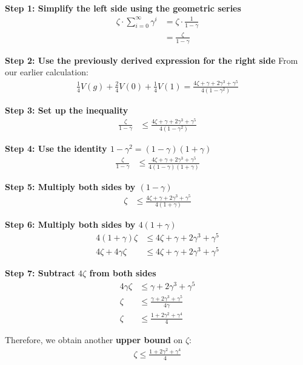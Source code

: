 \textbf{Step 1: Simplify the left side using the geometric series}
\begin{align}
\zeta\cdot\sum_{i=0}^\infty \gamma^i &= \zeta \cdot \frac{1}{1-\gamma}\\
&= \frac{\zeta}{1-\gamma}
\end{align}

\textbf{Step 2: Use the previously derived expression for the right side}
From our earlier calculation:
\begin{align}
\frac{1}{4}V(g) + \frac{2}{4}V(0) + \frac{1}{4}V(1) = \frac{4\zeta + \gamma + 2\gamma^3 + \gamma^5}{4(1-\gamma^2)}
\end{align}

\textbf{Step 3: Set up the inequality}
\begin{align}
\frac{\zeta}{1-\gamma} &\leq \frac{4\zeta + \gamma + 2\gamma^3 + \gamma^5}{4(1-\gamma^2)}
\end{align}

\textbf{Step 4: Use the identity $1-\gamma^2 = (1-\gamma)(1+\gamma)$}
\begin{align}
\frac{\zeta}{1-\gamma} &\leq \frac{4\zeta + \gamma + 2\gamma^3 + \gamma^5}{4(1-\gamma)(1+\gamma)}
\end{align}

\textbf{Step 5: Multiply both sides by $(1-\gamma)$}
\begin{align}
\zeta &\leq \frac{4\zeta + \gamma + 2\gamma^3 + \gamma^5}{4(1+\gamma)}
\end{align}

\textbf{Step 6: Multiply both sides by $4(1+\gamma)$}
\begin{align}
4(1+\gamma)\zeta &\leq 4\zeta + \gamma + 2\gamma^3 + \gamma^5\\
4\zeta + 4\gamma\zeta &\leq 4\zeta + \gamma + 2\gamma^3 + \gamma^5
\end{align}

\textbf{Step 7: Subtract $4\zeta$ from both sides}
\begin{align}
4\gamma\zeta &\leq \gamma + 2\gamma^3 + \gamma^5\\
\zeta &\leq \frac{\gamma + 2\gamma^3 + \gamma^5}{4\gamma}\\
\zeta &\leq \frac{1 + 2\gamma^2 + \gamma^4}{4}
\end{align}

Therefore, we obtain another \textbf{upper bound} on $\zeta$:
\begin{align}
\zeta \leq \frac{1 + 2\gamma^2 + \gamma^4}{4}
\end{align}

